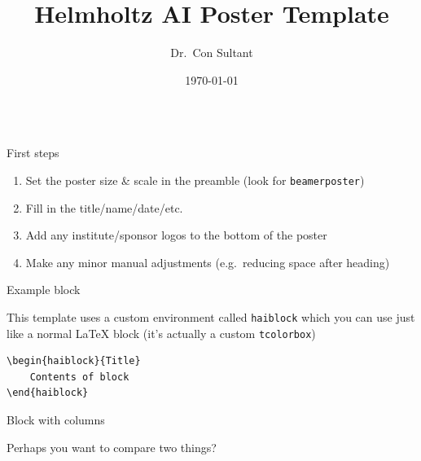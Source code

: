 \documentclass[aspectratio=1610]{beamer}
\title{Helmholtz AI Poster Template}
\author{Dr.\ Con Sultant}
\institute[Helmholtz AI]
  {Helmholtz AI, Germany}
\date{\today}
\begin{document}
\begin{frame}[fragile]{}

    
    \begin{columns}[t]
        \begin{column}{.5\linewidth}
        

            \begin{haiblock}{First steps}

                \begin{enumerate}
                    \item Set the poster size \& scale in the preamble
                        (look for \texttt{beamerposter})
                    \item Fill in the title/name/date/etc.
                    \item Add any institute/sponsor logos to the bottom of the poster
                    \item Make any minor manual adjustments (e.g.~reducing space after heading)
                \end{enumerate}

            \end{haiblock}
            \begin{haiblock}{Example block}

                This template uses a custom environment called
                \texttt{haiblock} which you can use just like a normal LaTeX block
                (it's actually a custom \texttt{tcolorbox})

                \begin{verbatim}
\begin{haiblock}{Title}
    Contents of block
\end{haiblock}
                \end{verbatim}

            \end{haiblock}
            
            \begin{haiblock}{Block with columns}

            Perhaps you want to compare two things?


\end{haiblock}
\end{column}
\end{columns}
\end{frame}
\end{document}
